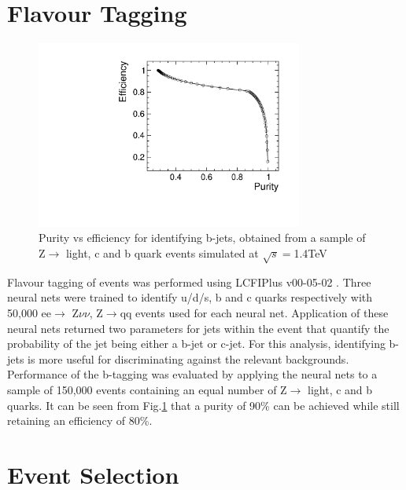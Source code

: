 \section{Flavour Tagging}

\begin{figure}[b]
  \centering
  \includegraphics[width=0.78\textwidth,keepaspectratio]{HiggsAnalysis/figures/updatedpurityvsefficiency.pdf}
  \caption[B-Tagging Purity vs Efficiency]{Purity vs efficiency for identifying b-jets, obtained from a sample of Z$\rightarrow$ light, c and b quark events simulated at $\sqrt{s}=$1.4TeV}
  \label{btag}
\end{figure}

Flavour tagging of events was performed using LCFIPlus v00-05-02 \cite{Suehara:2015ura}. Three neural nets were trained to identify u/d/s, b and c quarks respectively with 50,000 ee$\rightarrow$ Z$\nu\nu$, Z$\rightarrow$qq events used for each neural net. Application of these neural nets returned two parameters for jets within the event that quantify the probability of the jet being either a b-jet or c-jet. For this analysis, identifying b-jets is more useful for discriminating against the relevant backgrounds. Performance of the b-tagging was evaluated by applying the neural nets to a sample of 150,000 events containing an equal number of Z$\rightarrow$ light, c and b quarks. It can be seen from Fig.\ref{btag} that a purity of 90\% can be achieved while still retaining an efficiency of 80\%.

\section{Event Selection}

